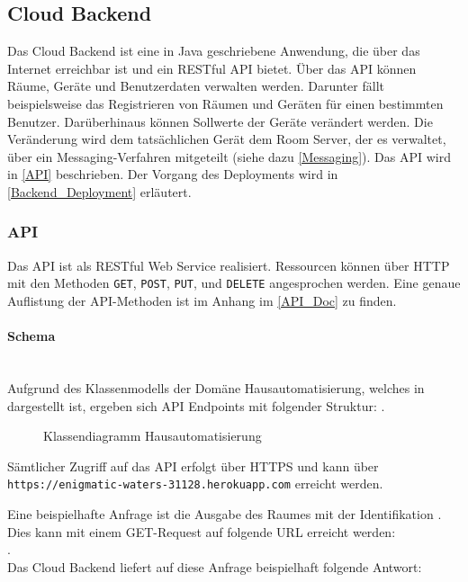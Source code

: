 \subsection{Cloud Backend}
Das Cloud Backend ist eine in Java geschriebene Anwendung, die über das Internet erreichbar ist und ein RESTful API bietet. Über das API können Räume, Geräte und Benutzerdaten verwalten werden. Darunter fällt beispielsweise das Registrieren von Räumen und Geräten für einen bestimmten Benutzer. Darüberhinaus können Sollwerte der Geräte verändert werden. Die Veränderung wird dem tatsächlichen Gerät \bzw dem Room Server, der es verwaltet, über ein Messaging-Verfahren mitgeteilt (siehe dazu \autoref{Messaging}). Das API wird in \autoref{API} beschrieben. Der Vorgang des Deployments wird in \autoref{Backend_Deployment} erläutert.

\subsubsection{API}\label{API}
Das API ist als RESTful Web Service realisiert. Ressourcen können über HTTP mit den Methoden \colorbox{pregray}{\lstinline{GET}}, \colorbox{pregray}{\lstinline{POST}}, \colorbox{pregray}{\lstinline{PUT}},  und \colorbox{pregray}{\lstinline{DELETE}} angesprochen werden. Eine genaue Auflistung der API-Methoden ist im Anhang im \autoref{API_Doc} zu finden.

 

\paragraph{Schema}\mbox{}\\
Aufgrund des Klassenmodells der Domäne Hausautomatisierung, welches in  dargestellt ist, ergeben sich API Endpoints mit folgender Struktur:
.


\begin{figure}[htb]
\centering
{}
\caption{Klassendiagramm Hausautomatisierung}
\label{fig:CD}
\end{figure}


Sämtlicher Zugriff auf das API erfolgt über HTTPS und kann über \colorbox{pregray}{\lstinline{https://enigmatic-waters-31128.herokuapp.com}} erreicht werden.

Eine beispielhafte Anfrage ist die Ausgabe des Raumes mit der Identifikation . Dies kann mit einem GET-Request auf folgende URL erreicht werden:\\ .\\ Das Cloud Backend liefert auf diese Anfrage beispielhaft folgende Antwort:

